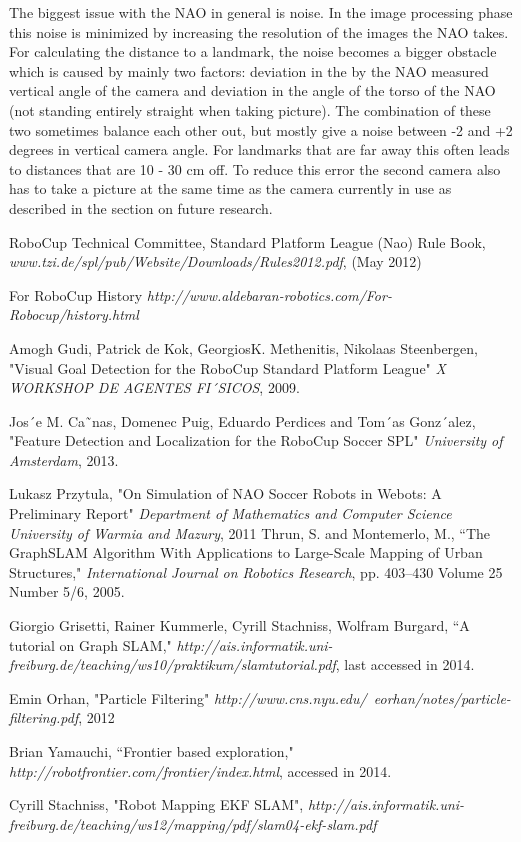 \documentclass{ba-kecs}
\numberwithin{figure}{section}
\numberwithin{equation}{section}
\begin{document}
The biggest issue with the NAO in general is noise. In the image processing phase this noise is minimized by increasing the resolution of the images the NAO takes. For calculating the distance to a landmark, the noise becomes a bigger obstacle which is caused by mainly two factors: deviation in the by the NAO measured vertical angle of the camera and deviation in the angle of the torso of the NAO (not standing entirely straight when taking picture).
The combination of these two sometimes balance each other out, but mostly give a noise between -2 and +2 degrees in vertical camera angle. For landmarks that are far away this often leads to distances that are 10 - 30 cm off. To reduce this error the second camera also has to take a picture at the same time as the camera currently in use as described in the section on future research. 




\begin{thebibliography}{99}

 RoboCup Technical Committee, Standard Platform League (Nao) Rule Book, \emph{www.tzi.de/spl/pub/Website/Downloads/Rules2012.pdf}, (May 2012)

 For RoboCup History \emph{http://www.aldebaran-robotics.com/For-Robocup/history.html}

 Amogh Gudi, Patrick de Kok, GeorgiosK. Methenitis, Nikolaas Steenbergen, "Visual Goal Detection for the RoboCup Standard Platform League" \emph{X WORKSHOP DE AGENTES FI´SICOS}, 2009.

 Jos´e M. Ca˜nas, Domenec Puig, Eduardo Perdices and Tom´as Gonz´alez, "Feature Detection and Localization for the
RoboCup Soccer SPL" \emph{University of Amsterdam}, 2013.

 Lukasz Przytula, "On Simulation of NAO Soccer Robots in Webots: A Preliminary Report" \emph{Department of Mathematics and Computer Science University of Warmia and Mazury}, 2011
 Thrun, S. and Montemerlo, M., ``The GraphSLAM Algorithm With Applications to Large-Scale Mapping of Urban Structures," \emph{International Journal on Robotics Research}, pp. 403--430 Volume 25 Number 5/6, 2005.

 Giorgio Grisetti, Rainer Kummerle, Cyrill Stachniss, Wolfram Burgard, ``A tutorial on Graph SLAM," \emph{http://ais.informatik.uni-freiburg.de/teaching/ws10/praktikum/slamtutorial.pdf}, last accessed in 2014.

 Emin Orhan, "Particle Filtering" \emph{http://www.cns.nyu.edu/~eorhan/notes/particle-filtering.pdf}, 2012
 
 Brian Yamauchi, ``Frontier based exploration," \emph{http://robotfrontier.com/frontier/index.html}, accessed in 2014. 

 Cyrill Stachniss, "Robot Mapping EKF SLAM", \emph{http://ais.informatik.uni-freiburg.de/teaching/ws12/mapping/pdf/slam04-ekf-slam.pdf }


\end{thebibliography}
\end{document}
